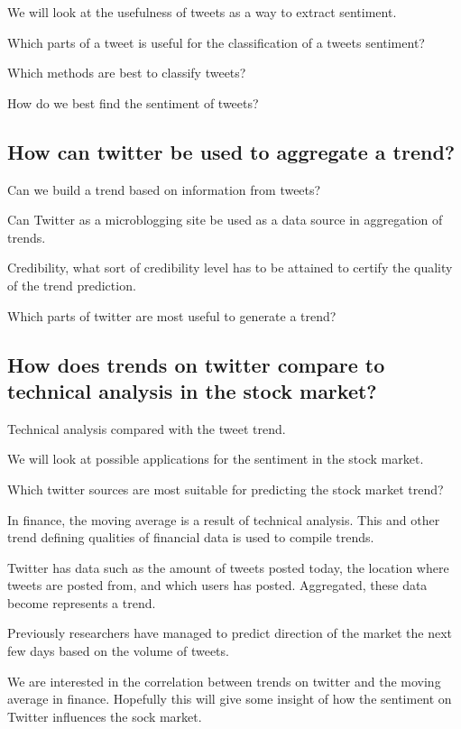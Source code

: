 We will look at the usefulness of tweets as a way to extract sentiment. 

Which parts of a tweet is useful for the classification of a tweets sentiment?

Which methods are best to classify tweets? 

How do we best find the sentiment of tweets?

\subsection{How can twitter be used to aggregate a
trend?}\label{introduction:rq2}
Can we build a trend based on information from tweets? 
 
Can Twitter as a microblogging site be used as a data source in aggregation of trends.

Credibility, what sort of credibility level has to be attained to certify the
quality of the trend prediction. 

Which parts of twitter are most useful to generate a trend?

\subsection{How does trends on twitter compare to technical analysis in the
stock market?}\label{introduction:rq3}
Technical analysis compared with the tweet trend.

We will look at possible applications for the sentiment in the stock market.

Which twitter sources are most suitable for predicting the stock market
trend?

In finance, the moving average is a result of technical analysis. This and
other trend defining qualities of financial data is used to compile trends. 

Twitter has data such as the amount of tweets posted today, the location where
tweets are posted from, and which users has posted. Aggregated, these data
become represents a trend.  

Previously researchers have managed to predict direction of the market the
next few days based on the volume of tweets. 

We are interested in the correlation between trends on twitter and the moving
average in finance. Hopefully this will give some insight of how the sentiment on
Twitter influences the sock market.  

